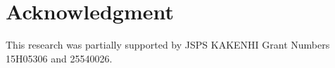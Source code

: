 \documentclass[conference]{IEEEtran}
\begin{document}
\IEEEpeerreviewmaketitle

\begin{comment}
I did not start my research career in year 2000!
 2001-2005: Bachelor 
 2005-2007: Master
 2007-2009: PhD

As a first draft, we drop a literature review part due to time-consuming work.
\end{comment}









%






\section*{Acknowledgment}
This research was partially supported by JSPS KAKENHI Grant Numbers 15H05306 and 25540026.


%

\end{document}
